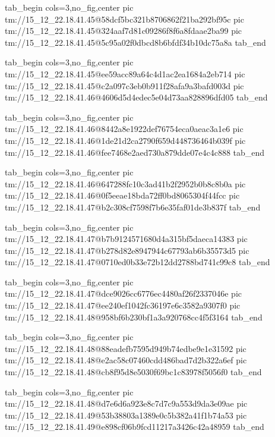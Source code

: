  
 
 
 
 

\qqSecCmtScr


\ifcmt
  tab_begin cols=3,no_fig,center
    pic tm://15_12_22.18.41.45@58dcf5bc321b8706862f21ba292bf95c
    pic tm://15_12_22.18.41.45@324aaf7d81c09286f8f6a8fdaae2ba99
    pic tm://15_12_22.18.41.45@5c95a02f0dbcd8b6bfdf34b10dc75a8a
  tab_end
\fi


\ifcmt
  tab_begin cols=3,no_fig,center
    pic tm://15_12_22.18.41.45@ee59acc89a64c4d1ac2ea1684a2eb714
    pic tm://15_12_22.18.41.45@c2a097c3eb0b911f28afa9a3bafd003d
    pic tm://15_12_22.18.41.46@4606d5d4edec5e04d73aa828896dfd05
  tab_end
\fi


\ifcmt
  tab_begin cols=3,no_fig,center
    pic tm://15_12_22.18.41.46@8442a8e1922def76754eca0aeac3a1e6
    pic tm://15_12_22.18.41.46@1de21d2ca2790f659d448736464b039f
    pic tm://15_12_22.18.41.46@fee7468e2aed730a879dde07e4c4c888
  tab_end
\fi


\ifcmt
  tab_begin cols=3,no_fig,center
    pic tm://15_12_22.18.41.46@647288fc10c3ad41b2f2952b0b8c8b0a
    pic tm://15_12_22.18.41.46@0f5eeae18bda72ff0bd8065304f44fcc
    pic tm://15_12_22.18.41.47@b2c308cf7598f7b6e35faf01de3b837f
  tab_end
\fi


\ifcmt
  tab_begin cols=3,no_fig,center
    pic tm://15_12_22.18.41.47@b7b9124571680d4a315bf5daeca14383
    pic tm://15_12_22.18.41.47@b278d82e8947944c67793ab6b35573d5
    pic tm://15_12_22.18.41.47@0710ed0b33e72b12dd2788bd741c99c8
  tab_end
\fi


\ifcmt
  tab_begin cols=3,no_fig,center
    pic tm://15_12_22.18.41.47@dce9026cc6776ec4480af26f2337046e
    pic tm://15_12_22.18.41.47@ee240ef1042fc36197e6c3582a9307f0
    pic tm://15_12_22.18.41.48@958bf6b230bf1a3a920768cc4f5f3164
  tab_end
\fi


\ifcmt
  tab_begin cols=3,no_fig,center
    pic tm://15_12_22.18.41.48@88eadefb7595d949b74edbe9e1e31592
    pic tm://15_12_22.18.41.48@e2ac58c07460cdd486bad7d2b322a6ef
    pic tm://15_12_22.18.41.48@cb8f95d8e5030f69bc1c83978f5056f0
  tab_end
\fi


\ifcmt
  tab_begin cols=3,no_fig,center
    pic tm://15_12_22.18.41.48@d7e6d6a923e8c7d7c9a553d9da3e09ae
    pic tm://15_12_22.18.41.49@53b38803a1389e0c5b382a41f1b74a53
    pic tm://15_12_22.18.41.49@e898cf06b9fcd11217a3426c42a48959
  tab_end
\fi



